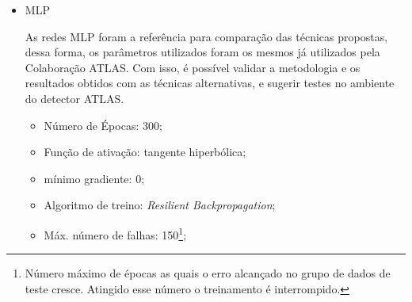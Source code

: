 \begin{itemize}
	\item MLP
	
	As redes MLP foram a referência para comparação das técnicas propostas, dessa forma, os parâmetros utilizados foram os mesmos já utilizados pela Colaboração ATLAS. Com isso, é possível validar a metodologia e os resultados obtidos com as técnicas alternativas, e sugerir testes no ambiente do detector ATLAS.
	\begin{itemize}
		\item Número de Épocas: 300;
		\item Função de ativação: tangente hiperbólica;
		\item mínimo gradiente: 0;
		\item Algoritmo de treino: \textit{Resilient Backpropagation};
		\item Máx. número de falhas: 150\footnote{Número máximo de épocas as quais o erro alcançado no grupo de dados de teste cresce. Atingido esse número o treinamento é interrompido.};
	
	\end{itemize}
\end{itemize}


